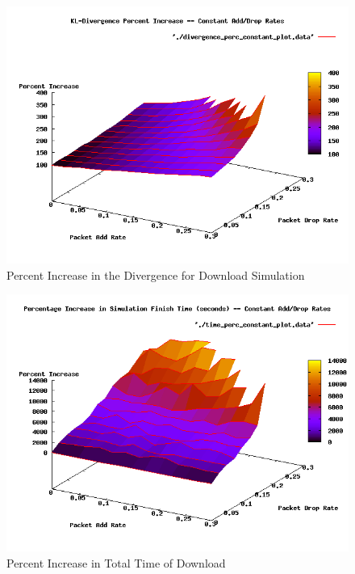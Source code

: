 \documentclass{usenixsubmit}
\begin{document}
\begin{figure}
	\centering
		\includegraphics[scale=0.5]{./plots/divergence_perc_constant_plot.png}
	\caption{Percent Increase in the Divergence for Download Simulation}
	\label{fig:divpercplot}
\end{figure}
\begin{figure}
	\centering
		\includegraphics[scale=0.5]{./plots/time_perc_constant_plot.png}
	\caption{Percent Increase in Total Time of Download}
	\label{fig:timepercplot}
\end{figure}
\end{document}
